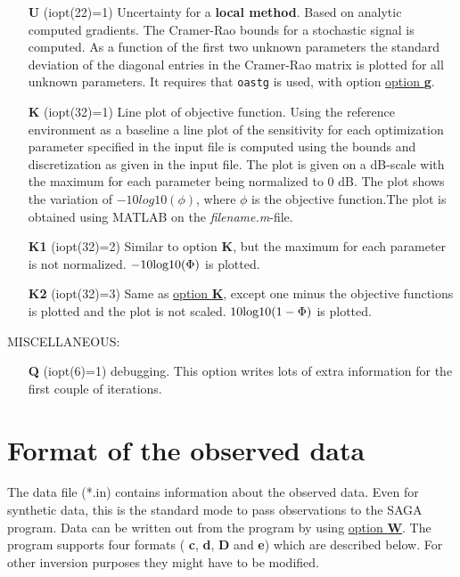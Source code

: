 \documentclass{saclantc}
\begin{document}
\begin{itemize}
\vspace{-0.3cm} \item[{\bf U}] (iopt(22)=1) Uncertainty for a {\bf
    local method}. 
 Based on analytic computed gradients. The Cramer-Rao bounds for a
   stochastic signal  is computed. As a function of the first two
   unknown parameters the standard deviation of the diagonal entries in
   the Cramer-Rao matrix is plotted for all unknown parameters. It
   requires that {\tt oastg} is used, with option \underline{option {\bf g}}.
\vspace{-0.3cm} \item[{\bf K}] (iopt(32)=1) Line plot of objective function. 
Using the reference environment as a baseline  a line plot of the
sensitivity for each optimization parameter specified in the input
file  is computed using the bounds and discretization as given in the
input file. The plot is given on a dB-scale with the maximum for each
parameter being normalized to 0 dB. The plot shows the variation of
$-10 log10 (\phi)$, where $\phi$ is the objective function.The plot is obtained using MATLAB on the {\it filename.m}-file. 
\vspace{-0.3cm} \item[{\bf K1}] (iopt(32)=2) Similar to option {\bf K}, but 
the maximum for each parameter is not normalized. $-10 { \rm log10} (\Phi)$ is plotted.
 \vspace{-0.3cm}    \item[{\bf K2}] (iopt(32)=3) 
Same as \underline{option {\bf K}}, except one minus the objective functions
 is plotted and the plot is not scaled. $10 { \rm log10} (1-\Phi)$ is plotted.
\end{itemize}

\noindent MISCELLANEOUS:

\vspace{-0.6cm}
\begin{itemize}
    \item[{\bf Q}] (iopt(6)=1) debugging. This  option writes  lots of extra 
information for the first couple of iterations. 
\end{itemize}
\newpage


\section{Format of the observed data}
\label{se:data}

The data file (*.in) contains information about the observed
data. Even for synthetic data, this is the standard mode to pass
observations to the {\sf SAGA} program.  Data can be written out from the
program by using \underline{option {\bf W}}.  The program supports four formats ({\bf
c}, {\bf d}, {\bf D} and {\bf e}) which are described below.  For
other inversion purposes they might have to be modified.
\end{document}
